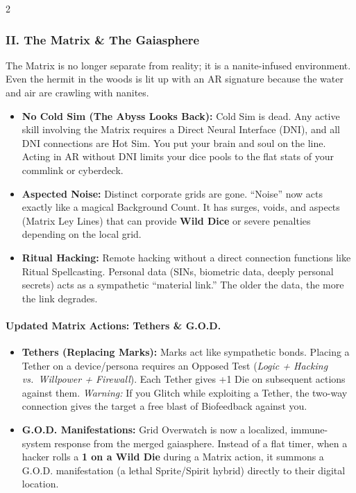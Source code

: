 \documentclass[
  oneside]{article}
\providecommand{\tightlist}{%
  \setlength{\itemsep}{0pt}\setlength{\parskip}{0pt}}
\begin{document}
\begin{multicols}{2}
{\subsubsection{II. The Matrix \& The
Gaiasphere}\label{ii.-the-matrix-the-gaiasphere}}

The Matrix is no longer separate from reality; it
is a nanite-infused environment. Even the hermit
in the woods is lit up with an AR signature
because the water and air are crawling with
nanites.

\begin{itemize}
\tightlist
\item
  \textbf{No Cold Sim (The Abyss Looks Back):}
  Cold Sim is dead. Any active skill involving the
  Matrix requires a Direct Neural Interface (DNI),
  and all DNI connections are Hot Sim. You put
  your brain and soul on the line. Acting in AR
  without DNI limits your dice pools to the flat
  stats of your commlink or cyberdeck.
\item
  \textbf{Aspected Noise:} Distinct corporate
  grids are gone. ``Noise'' now acts exactly like
  a magical Background Count. It has surges,
  voids, and aspects (Matrix Ley Lines) that can
  provide \textbf{Wild Dice} or severe penalties
  depending on the local grid.
\item
  \textbf{Ritual Hacking:} Remote hacking without
  a direct connection functions like Ritual
  Spellcasting. Personal data (SINs, biometric
  data, deeply personal secrets) acts as a
  sympathetic ``material link.'' The older the
  data, the more the link degrades.
\end{itemize}

\hypertarget{updated-matrix-actions-tethers-g.o.d.}{%
\paragraph{Updated Matrix Actions: Tethers \&
G.O.D.}\label{updated-matrix-actions-tethers-g.o.d.}}

\begin{itemize}
\tightlist
\item
  \textbf{Tethers (Replacing Marks):} Marks act
  like sympathetic bonds. Placing a Tether on a
  device/persona requires an Opposed Test
  (\emph{Logic + Hacking vs.~Willpower +
  Firewall}). Each Tether gives +1 Die on
  subsequent actions against them. \emph{Warning:}
  If you Glitch while exploiting a Tether, the
  two-way connection gives the target a free blast
  of Biofeedback against you.
\item
  \textbf{G.O.D. Manifestations:} Grid Overwatch
  is now a localized, immune-system response from
  the merged gaiasphere. Instead of a flat timer,
  when a hacker rolls a \textbf{1 on a Wild Die}
  during a Matrix action, it summons a G.O.D.
  manifestation (a lethal Sprite/Spirit hybrid)
  directly to their digital location.
\end{itemize}


\end{multicols}
\end{document}
